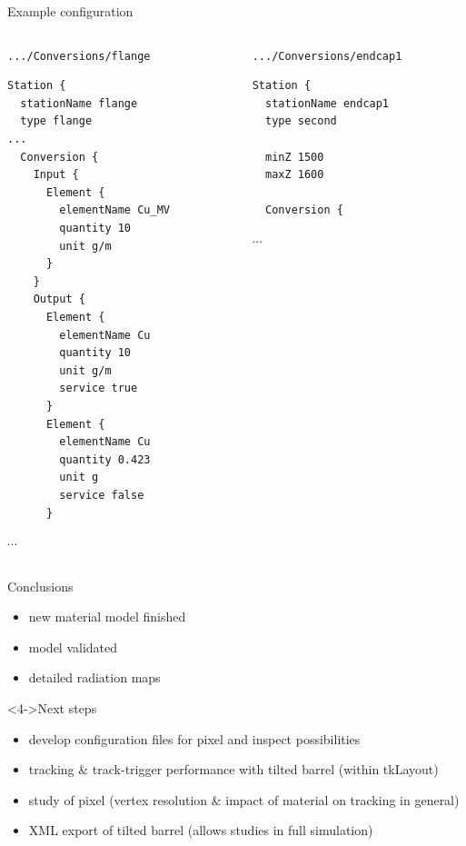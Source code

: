 \documentclass[pdftex, 11pt]{beamer}
\newcommand{\pat}[1]{\texttt{#1}}
\begin{document}
\begin{frame}[fragile]{Example configuration}
  \tiny
  \begin{columns}[t]
    \begin{column}{0.47\textwidth}
      \begin{block}{\pat{.../Conversions/flange}}
\begin{verbatim}
Station {
  stationName flange
  type flange
...
  Conversion {
    Input {
      Element {
        elementName Cu_MV
        quantity 10
        unit g/m
      }
    }
    Output {
      Element {
        elementName Cu
        quantity 10
        unit g/m
        service true
      }
      Element {
        elementName Cu
        quantity 0.423
        unit g
        service false
      }
\end{verbatim}
$\cdots$
      \end{block}
    \end{column}
    \begin{column}{0.47\textwidth}
      \begin{block}{\pat{.../Conversions/endcap1}}
\begin{verbatim}
Station {
  stationName endcap1
  type second

  minZ 1500
  maxZ 1600

  Conversion {
\end{verbatim}
$\cdots$
      \end{block}
    \end{column}
  \end{columns}
\end{frame}

\begin{frame}
  \begin{block}{Conclusions}
    \begin{itemize}
    \item new material model \alert{finished}
    \item<2-> model validated
    \item<3-> detailed \alert{radiation maps}
    \end{itemize}    
  \end{block}
  \begin{block}<4->{Next steps}
    \begin{itemize}
    \item<4-> develop configuration files for \alert{pixel} and
      \alert{inspect} possibilities
    \item<5-> tracking \& track-trigger performance with \alert{tilted} barrel (within tkLayout) 
    \item<6-> study of \alert{pixel} (vertex resolution \& impact of material on tracking in general)
    \item<7-> XML export of tilted barrel (allows studies in full simulation)
    \end{itemize}
  \end{block}
\end{frame}
\end{document}
